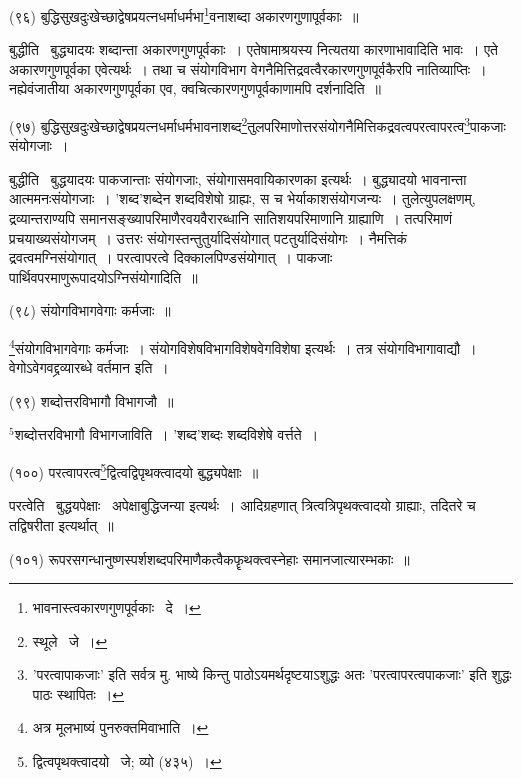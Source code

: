 \documentclass[11pt, openany]{book}
\begin{document}
{\newpage
\hangindent=2cm {\knu (९६) बुद्धिसुखदुःखेच्छाद्वेषप्रयत्नधर्माधर्मभा\renewcommand{\thefootnote}{1}\footnote{भावनास्त्वकारणगुणपूर्वकाः \textendash\ दे~।}वनाशब्दा अकारणगुणापूर्वकाः~॥}

{\knu बुद्धीति} \textendash\ बुद्ध्यादयः शब्दान्ता अकारणगुणपूर्वकाः~। एतेषामाश्रयस्य नित्यतया कारणाभावादिति भावः~। एते अकारणगुणपूर्वका एवेत्यर्थः~। तथा च संयोगविभाग वेगनैमित्तिद्रवत्वैरकारणगुणपूर्वकैरपि नातिव्याप्तिः~। नह्येवंजातीया अकारणगुणपूर्वका एव, क्वचित्कारणगुणपूर्वकाणामपि दर्शनादिति~॥

\begin{sloppypar}
\hangindent=2cm {\knu (९७) बुद्धिसुखदुःखेच्छाद्वेषप्रयत्नधर्माधर्मभावनाशब्द\renewcommand{\thefootnote}{2}\footnote{स्थूले \textendash\ जे~।}तुलपरिमाणोत्तरसंयोगनैमित्तिकद्रवत्वपरत्वापरत्व\renewcommand{\thefootnote}{3}\footnote{'परत्वापाकजाः' इति सर्वत्र मु. भाष्ये किन्तु पाठोऽयमर्थदृष्टयाऽशुद्धः अतः 'परत्वापरत्वपाकजाः' इति शुद्धः पाठः स्थापितः~।}पाकजाः संयोगजाः~।}
\end{sloppypar}

{\knu बुद्धीति} \textendash\ बुद्धयादयः पाकजान्ताः संयोगजाः, संयोगासमवायिकारणका इत्यर्थः~। बुद्ध्यादयो भावनान्ता आत्ममनःसंयोगजाः~। 'शब्द'शब्देन शब्दविशेषो ग्राह्यः, स च भेर्याकाशसंयोगजन्यः~। तुलेत्युपलक्षणम्, द्रव्यान्तराण्यपि समानसङ्ख्यापरिमाणैरवयवैरारब्धानि सातिशयपरिमाणानि ग्राह्याणि~। तत्परिमाणं प्रचयाख्यसंयोगजम्~। उत्तरः संयोगस्तन्तुतुर्यादिसंयोगात् पटतुर्यादिसंयोगः~। नैमत्तिकं द्रवत्वमग्निसंयोगात्~। परत्वापरत्वे दिक्कालपिण्डसंयोगात्~। पाकजाः पार्थिवपरमाणुरूपादयोऽग्निसंयोगादिति~॥

\hangindent=2cm {\knu (९८) संयोगविभागवेगाः कर्मजाः~॥}

{\knu \renewcommand{\thefootnote}{4, 5}\footnote{अत्र मूलभाष्यं पुनरुक्तमिवाभाति~।}संयोगविभागवेगाः कर्मजाः~।} संयोगविशेषविभागविशेषवेगविशेषा इत्यर्थः~। तत्र संयोगविभागावाद्यौ~। वेगोऽवेगवद्द्रव्यारब्धे वर्तमान इति~।

\hangindent=2cm {\knu (९९) शब्दोत्तरविभागौ विभागजौ~॥}

{\knu ${}^5$शब्दोत्तरविभागौ विभागजाविति~।} 'शब्द'शब्दः शब्दविशेषे वर्त्तते~।

\hangindent=2cm {\knu (१००) परत्वापरत्व\renewcommand{\thefootnote}{6}\footnote{द्वित्वपृथक्त्वादयो \textendash\ जे; व्यो (४३५)~।}द्वित्वद्विपृथक्त्वादयो बुद्ध्यपेक्षाः~॥}

{\knu परत्वेति} \textendash\ बुद्धयपेक्षाः \textendash\ अपेक्षाबुद्धिजन्या इत्यर्थः~। आदिग्रहणात् त्रित्वत्रिपृथक्त्वादयो ग्राह्याः, तदितरे च तद्विषरीता इत्यर्थात्~॥

\newpage
\hangindent=2cm {\knu (१०१) रूपरसगन्धानुष्णस्पर्शशब्दपरिमाणैकत्वैकफॄथक्त्वस्नेहाः समानजात्यारम्भकाः~॥}

}
\end{document}
